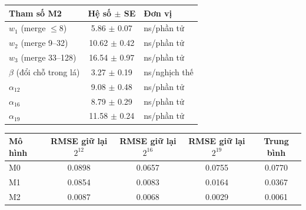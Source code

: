 \begin{tabular}{lcl}
\toprule
Tham số M2 & Hệ số $\pm$ SE & Đơn vị \\
\midrule
$w_1$ (merge $\le 8$) & 5.86 $\pm$ 0.07 & ns/phần tử \\
$w_2$ (merge 9--32) & 10.62 $\pm$ 0.42 & ns/phần tử \\
$w_3$ (merge 33--128) & 16.54 $\pm$ 0.97 & ns/phần tử \\
$\beta$ (đổi chỗ trong lá) & 3.27 $\pm$ 0.19 & ns/nghịch thế \\
$\alpha_{12}$ & 9.08 $\pm$ 0.48 & ns/phần tử \\
$\alpha_{16}$ & 8.79 $\pm$ 0.29 & ns/phần tử \\
$\alpha_{19}$ & 11.58 $\pm$ 0.24 & ns/phần tử \\
\bottomrule
\end{tabular}
\medskip

\begin{tabular}{lcccc}
\toprule
Mô hình & RMSE giữ lại $2^{12}$ & RMSE giữ lại $2^{16}$ & RMSE giữ lại $2^{19}$ & Trung bình \\
\midrule
M0 & 0.0898 & 0.0657 & 0.0755 & 0.0770 \\
M1 & 0.0854 & 0.0083 & 0.0164 & 0.0367 \\
M2 & 0.0087 & 0.0068 & 0.0029 & 0.0061 \\
\bottomrule
\end{tabular}
